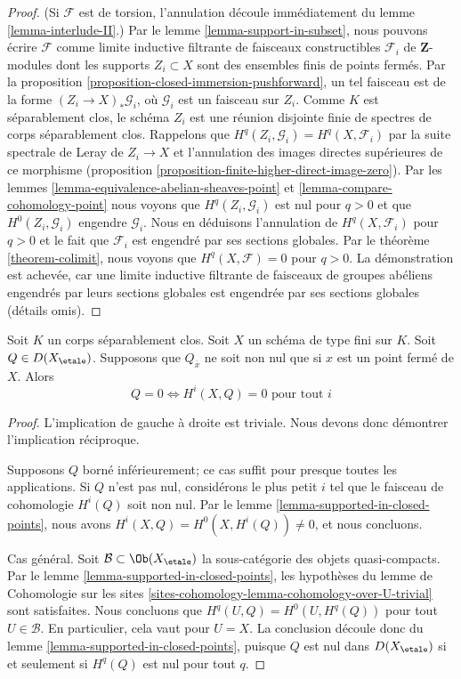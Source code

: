 \begin{proof}
(Si $\mathcal{F}$ est de torsion, l'annulation découle immédiatement
du lemme \ref{lemma-interlude-II}.)
Par le lemme \ref{lemma-support-in-subset}, nous pouvons écrire $\mathcal{F}$
comme limite inductive filtrante de faisceaux constructibles $\mathcal{F}_i$
de $\mathbf{Z}$-modules dont les supports $Z_i \subset X$ sont des ensembles
finis de points fermés. Par la
proposition \ref{proposition-closed-immersion-pushforward},
un tel faisceau est de la forme $(Z_i \to X)_*\mathcal{G}_i$,
où $\mathcal{G}_i$ est un faisceau sur $Z_i$. Comme $K$ est séparablement clos,
le schéma $Z_i$ est une réunion disjointe finie de spectres de corps
séparablement clos. Rappelons que $H^q(Z_i, \mathcal{G}_i) = H^q(X, \mathcal{F}_i)$
par la suite spectrale de Leray de $Z_i \to X$ et l'annulation des images
directes supérieures de ce morphisme
(proposition \ref{proposition-finite-higher-direct-image-zero}).
Par les lemmes \ref{lemma-equivalence-abelian-sheaves-point} et
\ref{lemma-compare-cohomology-point}
nous voyons que $H^q(Z_i, \mathcal{G}_i)$ est nul pour $q > 0$
et que $H^0(Z_i, \mathcal{G}_i)$ engendre $\mathcal{G}_i$.
Nous en déduisons l'annulation de $H^q(X, \mathcal{F}_i)$ pour $q > 0$
et le fait que $\mathcal{F}_i$ est engendré par ses sections globales.
Par le théorème \ref{theorem-colimit}, nous voyons que
$H^q(X, \mathcal{F}) = 0$ pour $q > 0$.
La démonstration est achevée, car une
limite inductive filtrante de faisceaux de groupes abéliens engendrés par leurs sections globales
est engendrée par ses sections globales (détails omis).
\end{proof}

\begin{lemma}
\label{lemma-vanishing-closed-points}
Soit $K$ un corps séparablement clos. Soit $X$ un schéma de type
fini sur $K$. Soit $Q \in D(X_\etale)$. Supposons que $Q_{\overline{x}}$
ne soit non nul que si $x$ est un point fermé de $X$. Alors
$$
Q = 0 \Leftrightarrow H^i(X, Q) = 0 \text{ pour tout }i
$$
\end{lemma}

\begin{proof}
L'implication de gauche à droite est triviale. Nous devons donc
démontrer l'implication réciproque.

\medskip\noindent
Supposons $Q$ borné inférieurement; ce cas suffit pour presque toutes les
applications. Si $Q$ n'est pas nul, considérons le plus petit $i$
tel que le faisceau de cohomologie $H^i(Q)$ soit non nul.
Par le lemme \ref{lemma-supported-in-closed-points}, nous avons
$H^i(X, Q) = H^0(X, H^i(Q)) \not = 0$, et nous concluons.

\medskip\noindent
Cas général. Soit $\mathcal{B} \subset \Ob(X_\etale)$ la sous-catégorie des
objets quasi-compacts. Par le lemme \ref{lemma-supported-in-closed-points},
les hypothèses du lemme de Cohomologie sur les sites
\ref{sites-cohomology-lemma-cohomology-over-U-trivial}
sont satisfaites. Nous concluons que $H^q(U, Q) = H^0(U, H^q(Q))$
pour tout $U \in \mathcal{B}$. En particulier, cela vaut pour $U = X$.
La conclusion découle donc du lemme \ref{lemma-supported-in-closed-points},
puisque $Q$ est nul dans $D(X_\etale)$ si et seulement si $H^q(Q)$ est nul
pour tout $q$.
\end{proof}

